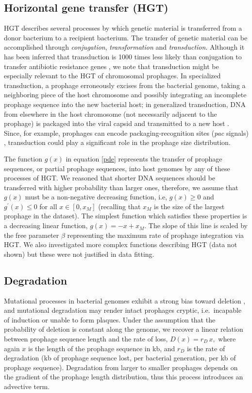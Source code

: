 \subsection{Horizontal gene transfer (HGT)} 
HGT describes several processes by which genetic material is transferred from a donor bacterium to a recipient bacterium. The transfer of genetic material can be accomplished through \textit{conjugation}, \textit{transformation} and \textit{transduction}.  Although it has been inferred that transduction is 1000 times less likely than conjugation to transfer antibiotic resistance genes \citep{volkova_modeling_2014}, we note that transduction might be especially relevant to the HGT of chromosomal prophages.  In specialized transduction, a prophage erroneously excises from the bacterial genome, taking a neighboring piece of the host chromosome and possibly integrating an incomplete prophage sequence into the new bacterial host; in generalized transduction, DNA from elsewhere in the host chromosome (not necessarily adjacent to the prophage) is packaged into the viral capsid and transmitted to a new host \citep{touchon_embracing_2017}.  Since, for example, prophages can encode packaging-recognition sites (\textit{pac} signals) \citep{casjens_bacteriophages_2009}, transduction could play a significant role in the prophage size distribution. 

The function $g(x)$ in equation \ref{pde} represents the transfer of prophage sequences, or partial prophage sequences, into host genomes by any of these processes of HGT.  We reasoned that shorter DNA sequences should be transferred with higher probability than larger ones, therefore, we assume that $g(x)$ must be a non-negative decreasing function, i.e, $g(x) \geq 0$ and $g^{'}(x) \leq 0$ for all $x \in [0,x_M]$ (recalling that $x_M$ is the size of the largest prophage in the dataset).  The simplest function which satisfies these properties is a decreasing linear function, 
$g(x) = -x + x_M$.  The slope of this line is scaled by the free parameter $\beta$ representing the maximum rate of prophage integration via HGT.  We also investigated more complex functions describing HGT (data not shown) but these were not justified in data fitting. 

\subsection{Degradation} Mutational processes in bacterial genomes exhibit a strong bias toward deletion \citep{kuo_deletional_2009}, and mutational degradation may render intact prophages cryptic, i.e.\, incapable of induction or unable to form plaques.  Under the assumption that the probability of deletion is constant along the genome, we recover a linear relation between prophage sequence length and the rate of loss, $D(x) = r_{D}\,x,$ where again $x$ is the length of the prophage sequence in kb, and $r_{D}$ is the rate of degradation (kb of prophage sequence lost, per bacterial generation, per kb of prophage sequence).  Degradation from larger to smaller prophages depends on the gradient of the prophage length distribution, thus this process introduces an advective term.

